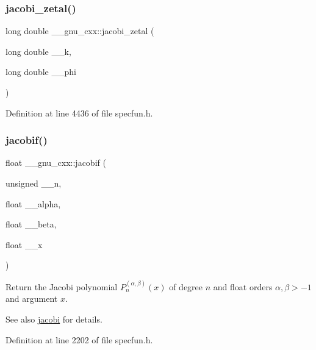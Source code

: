 \subsubsection{\texorpdfstring{jacobi\+\_\+zetal()}{jacobi\_zetal()}}
{\footnotesize\ttfamily long double \+\_\+\+\_\+gnu\+\_\+cxx\+::jacobi\+\_\+zetal (\begin{DoxyParamCaption}\item[{long double}]{\+\_\+\+\_\+k,  }\item[{long double}]{\+\_\+\+\_\+phi }\end{DoxyParamCaption})\hspace{0.3cm}{\ttfamily [inline]}}



Definition at line 4436 of file specfun.\+h.

\mbox{\label{group__gnu__math__spec__func_ga450db12e06d6993d169afab5b3f6d0b8}} 
\subsubsection{\texorpdfstring{jacobif()}{jacobif()}}
{\footnotesize\ttfamily float \+\_\+\+\_\+gnu\+\_\+cxx\+::jacobif (\begin{DoxyParamCaption}\item[{unsigned}]{\+\_\+\+\_\+n,  }\item[{float}]{\+\_\+\+\_\+alpha,  }\item[{float}]{\+\_\+\+\_\+beta,  }\item[{float}]{\+\_\+\+\_\+x }\end{DoxyParamCaption})\hspace{0.3cm}{\ttfamily [inline]}}

Return the Jacobi polynomial $ P_n^{(\alpha,\beta)}(x) $ of degree $ n $ and {\ttfamily float} orders $ \alpha, \beta > -1 $ and argument $ x $.

\begin{DoxySeeAlso}{See also}
\hyperlink{group__gnu__math__spec__func_gad54f6601748324d268532138eb38ca33}{jacobi} for details. 
\end{DoxySeeAlso}


Definition at line 2202 of file specfun.\+h.



